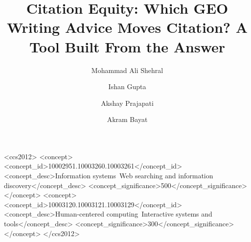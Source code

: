\documentclass[sigconf,screen,review]{acmart}
\begin{document}
\title{Citation Equity: Which GEO Writing Advice Moves Citation? A Tool Built From the Answer}

\author{Mohammad Ali Shehral}

\author{Ishan Gupta}

\author{Akshay Prajapati}

\author{Akram Bayat}

\renewcommand{\shortauthors}{Shehral et al.}



\begin{CCSXML}
<ccs2012>
<concept><concept_id>10002951.10003260.10003261</concept_id>
<concept_desc>Information systems~Web searching and information discovery</concept_desc>
<concept_significance>500</concept_significance></concept>
<concept><concept_id>10003120.10003121.10003129</concept_id>
<concept_desc>Human-centered computing~Interactive systems and tools</concept_desc>
<concept_significance>300</concept_significance></concept>
</ccs2012>
\end{CCSXML}
\end{document}
